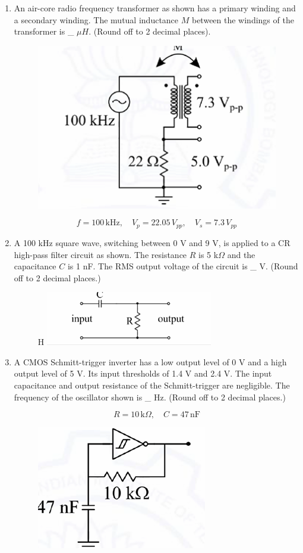 \documentclass[journal,12pt,onecolumn]{IEEEtran}
\theoremstyle{remark}
\begin{document}
\begin{flushleft}
\begin{enumerate}
\item An air-core radio frequency transformer as shown has a primary winding and a secondary winding. The mutual inductance $M$ between the windings of the transformer is \_ $\mu H$. (Round off to 2 decimal places).
\begin{figure}[H]
    \centering
    \includegraphics[width=0.5\columnwidth]{figs/60.png}
    \caption{}
    \label{fig:placeholder}
\end{figure}

\[
f = 100 \,\text{kHz}, \quad V_p = 22.05 \, V_{pp}, \quad V_s = 7.3 \, V_{pp}
\]


\item A 100 kHz square wave, switching between 0 V and 9 V, is applied to a CR high-pass filter circuit as shown. The resistance $R$ is 5 k$\Omega$ and the capacitance $C$ is 1 nF. The RMS output voltage of the circuit is \_ V. (Round off to 2 decimal places.)

\begin{figure}{H}
    \centering
    \includegraphics[width=0.5\columnwidth]{figs/61.png}
    \caption{}
    \label{fig:placeholder}
\end{figure}


\item A CMOS Schmitt-trigger inverter has a low output level of 0 V and a high output level of 5 V. Its input thresholds of 1.4 V and 2.4 V. The input capacitance and output resistance of the Schmitt-trigger are negligible. The frequency of the oscillator shown is \_ Hz. (Round off to 2 decimal places.)

\[
R = 10 \,\text{k}\Omega, \quad C = 47 \,\text{nF}
\]


\begin{figure}[H]
    \centering
    \includegraphics[width=0.5\columnwidth]{figs/62.png}
    \caption{}
    \label{fig:placeholder}
\end{figure}



\end{enumerate}
\end{flushleft}
\end{document}
